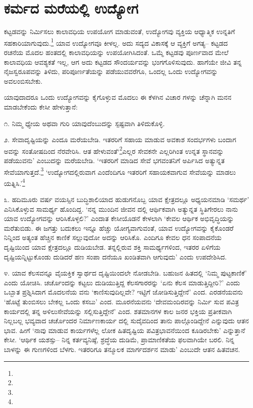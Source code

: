 \section{ಕರ್ಮದ ಮರೆಯಲ್ಲಿ ಉದ್ಯೋಗ}

ಕಟ್ಟಡವನ್ನು ನಿರ್ಮಿಸಲು ಕಾಲಾವಧಿಯ  ಉಪಯೋಗ ಮಾಡುವಂತೆ, ಉದ್ಯೋಗವು ವ್ಯಕ್ತಿಯ ಆಧ್ಯಾತ್ಮಿಕ ಉನ್ನತಿಗೆ ಸಹಕಾರಿಯಾಗುವುದು.\footnote{} ಯಾವ ಉದ್ಯೋಗವೂ ಕೀಳಲ್ಲ. ಅದು ಸದ್ಯದ ವಿಕಾಸಕ್ಕೆ ಆ ವ್ಯಕ್ತಿಗೆ ಅಗತ್ಯ– ಕಟ್ಟಡದ ರಚನೆಯ ಮೊದಲ ಹಂತದಲ್ಲಿ ಕಾಲಾವಧಿಯನ್ನು ಉಪಯೋಗಿಸಿದಂತೆ. ಒಮ್ಮೆ ಕಟ್ಟಡವು ಪೂರ್ಣವಾದ ಮೇಲೆ ಕಾಲಾವಧಿಯ ಆವಶ್ಯಕತೆ ಇಲ್ಲ, ಆಗ ಅದು ಕಟ್ಟಡದ ಸೌಂದರ್ಯವನ್ನು ಭಂಗಗೊಳಿಸುವುದು. ಹಾಗೆಯೇ ಜೀವಿ ತನ್ನ ನೈಜಸ್ವರೂಪವನ್ನು ತಿಳಿದು, ಪರಿಪೂರ್ಣತೆಯನ್ನು ಪಡೆಯುವವರೆಗೂ, ಒಂದಲ್ಲ ಒಂದು ಉದ್ಯೋಗವನ್ನು ಅವಲಂಬಿಸಬೇಕು.

ಯಾವುದಾದರೂ ಒಂದು ಉದ್ಯೋಗವನ್ನು ಕೈಗೊಳ್ಳುವ ಮೊದಲು ಈ ಕೆಳಗಿನ ವಿಚಾರ ಗಳನ್ನು ಚೆನ್ನಾಗಿ ಮನನ ಮಾಡಬೇಕೆಂದು ಕೇಸೀ ಹೇಳುತ್ತಾನೆ:

೧. ನಿಮ್ಮ ಧ್ಯೇಯ ಅಥವಾ ಗುರಿ ಯಾವುದೆಂಬುದನ್ನು ಸ್ಪಷ್ಟವಾಗಿ ತಿಳಿದುಕೊಳ್ಳಿ.

೨. ಸೇವಾದೃಷ್ಟಿಯನ್ನು ಎಂದೂ ಮರೆಯಬೇಡಿ. ಇತರರಿಗೆ ಸಹಾಯ ಮಾಡುವ ಅವಕಾಶ ಸಂದರ್ಭಗಳು ಬಂದಾಗ ಅವನ್ನು ಸಂತೋಷದಿಂದ ನೆರವೇರಿಸಿ. ಆತ ಹೇಳುವಂತೆ‘\footnote{}ಎಲ್ಲರ ಸೇವಕನೇ ಎಲ್ಲರಿಗಿಂತ ಉನ್ನತ ಸ್ಥಾನವನ್ನು ಪಡೆಯುವನು’ ಎಂಬುದನ್ನು ಮರೆಯಬೇಡಿ. ‘ಇತರರಿಗೆ ಮಾಡಿದ ಸೇವೆ ಭಗವಂತನಿಗೆ ಅರ್ಪಿಸಿದ ಅತ್ಯುನ್ನತ ಸೇವೆಯಾಗುತ್ತದೆ.\footnote{} ‘ಉದ್ಯೋಗದಲ್ಲಿರುವಾಗ ಎಂದೆಂದಿಗೂ ಇತರರಿಗೆ ಸಹಾಯಕವಾಗುವ ಸೇವೆಯನ್ನು ಮಾಡಲು ಯತ್ನಿಸಿ.'\footnote{}

೩. ಹದಿಮೂರು ವರ್ಷ ವಯಸ್ಸಿನ ಬುದ್ಧಿಶಾಲಿಯಾದ ಹುಡುಗನೊಬ್ಬ ಯಾವ ಕ್ಷೇತ್ರದಲ್ಲೂ ಅಧ್ಯಯನಮಾಡಿ ‘ಸಮರ್ಥ’ ಎನಿಸಿಕೊಳ್ಳುವ ಸಾಮರ್ಥ್ಯ ಹೊಂದಿದ್ದ. ‘ನನ್ನ ಮುಂದಿನ ಜೀವನ ದಲ್ಲಿ ಆರ್ಥಿಕವಾಗಿ ಅತ್ಯುನ್ನತ ಸ್ಥಿತಿಗೇರಲು ನಾನು ಯಾವ ಉದ್ಯೋಗವನ್ನು ಆರಿಸಿಕೊಳ್ಳಲಿ?’ ಎಂದಾತ ಕೇಸೀಯೊಡನೆ ಕೇಳಲಾಗಿ ‘ಕೇವಲ ಆರ್ಥಿಕ ಅಭಿವೃದ್ಧಿಯನ್ನು ಮರೆತುಬಿಡು. ಈ ಜಗತ್ತು ಬದುಕಲು ಇನ್ನೂ ಹೆಚ್ಚು ಯೋಗ್ಯವಾಗುವಂತೆ, ಯಾವ ಉದ್ಯೋಗವನ್ನು ಕೈಕೊಂಡರೆ ನಿನ್ನಿಂದ ಅತ್ಯಂತ ಹೆಚ್ಚಿನ ಕಾಣಿಕೆ ಸಲ್ಲುವುದೋ ಅದನ್ನು ಆರಿಸಿಕೊ. ಎಂದಿಗೂ ಕೇವಲ ಧನ ಸಂಪಾದನೆಯ ದೃಷ್ಟಿಯಿಂದ ಯಾವ ಕ್ಷೇತ್ರದಲ್ಲೂ ದುಡಿಯಬೇಡ. ತನ್ನಲ್ಲಿರುವ ಶಕ್ತಿ ಸಾಮರ್ಥ್ಯಗಳಿಂದ, ಇತರರ ಏಳಿಗೆಯ ದೃಷ್ಟಿಯನ್ನಿಟ್ಟುಕೊಂಡು ದುಡಿದರೆ ಹಣ ಸಂಪಾ ದನೆಯೂ ಖಂಡಿತವಾಗಿ ಆಗುವುದು’ ಎಂದು ಉಪದೇಶಿಸಿದ.

೪. ಯಾವ ಕೆಲಸವನ್ನೂ ವೈಯಕ್ತಿಕ ಸ್ವಾರ್ಥದ ದೃಷ್ಟಿಯಿಂದಲೇ ನೋಡಬೇಡಿ. ಬಹುಜನ ಹಿತದಲ್ಲಿ ‘ನಿಮ್ಮ ಪುಟ್ಟಕಾಣಿಕೆ’ ಎಂದು ಯೋಚಿಸಿ. ಚರ್ಚೊಂದನ್ನು ಕಟ್ಟಲು ದುಡಿಯುತ್ತಿದ್ದ ಕೆಲಸಗಾರರನ್ನು ‘ಏನು ಕೆಲಸ ಮಾಡುತ್ತಿದ್ದೀರಿ?’ ಎಂದು ಒಬ್ಬಾತ ಪ್ರಶ್ನಿಸಿದಾಗ ಮೊದಲನೆಯ ವನು ‘ಕಾಣಿಸುವುದಿಲ್ಲವೇ? ಇಟ್ಟಿಗೆ ಜೋಡಿಸುತ್ತಿದ್ದೇನೆ’ ಎಂದ. ಎರಡನೆಯವನು ‘ಹೊಟ್ಟೆ ತುಂಬಿಸಲು ಬೇಕಲ್ಲ ಒಂದು ಕಸಬು’ ಎಂದ. ಮೂರನೆಯವನು ‘ದೇವಮಂದಿರವನ್ನು ನಿರ್ಮಿ ಸುವ ಪವಿತ್ರ ಕಾರ್ಯದಲ್ಲಿ ತನ್ನ ಅಳಿಲುಸೇವೆಯನ್ನು ಸಲ್ಲಿಸುತ್ತಿದ್ದೇನೆ’ ಎಂದ. ಶತಮಾನಗಳ ಕಾಲ ಜನರ ಭಕ್ತಿಯ ಪ್ರತೀಕವಾಗಿ ನಿಲ್ಲಬಲ್ಲ ಭವ್ಯವಾದ ಚರ್ಚೊಂದರ ನಿರ್ಮಾಣಕಾರ್ಯ ದಲ್ಲಿ ಸುದೈವದಿಂದ ತಾನು ಪಾಲ್ಗೊಂಡಿದ್ದೇನೆ ಎನ್ನುವುದು ಆತನ ಭಾವ. ಹೀಗೆ ‘ನಾವು ಮಾಡುವ ಕಾರ್ಯಗಳೆಲ್ಲ ಲೋಕ ಹಿತದೃಷ್ಟಿಯ ಪವಿತ್ರಭಾವನೆಯಿಂದ ಕೂಡಿರಬೇಕು’ ಎನ್ನುತ್ತಾನೆ ಕೇಸೀ. ‘ಆರ್ಥಿಕ ಯಶಸ್ಸು– ನಿನ್ನ ಕರ್ತವ್ಯನಿಷ್ಠೆ, ಶ್ರದ್ಧೆಯ ದುಡಿಮೆ, ಪ್ರಾಮಾಣಿಕತೆಯ ಫಲವಾಗಿಯೇ ಬರಲಿ. ನಿನ್ನ ಬಾಳನ್ನು ಈ ಗುಣಗಳಿಂದ ಬೆಳಗು. ಇತರರಿಗೂ ತನ್ಮೂಲಕ ಮಾರ್ಗದರ್ಶನ ಮಾಡು’ ಎಂಬುದೇ ಆತನ ಹಿತವಚನ.


